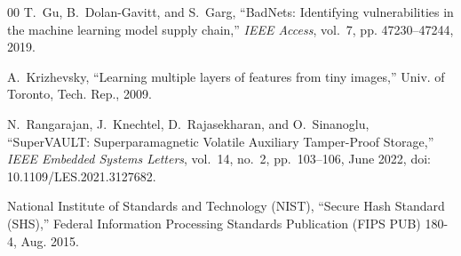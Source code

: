 \documentclass[conference,10pt]{IEEEtran}
\begin{document}
\begin{thebibliography}{00}
T.~Gu, B.~Dolan-Gavitt, and S.~Garg, ``BadNets: Identifying vulnerabilities in the machine learning model supply chain,'' \textit{IEEE Access}, vol.~7, pp. 47230--47244, 2019.

A.~Krizhevsky, ``Learning multiple layers of features from tiny images,'' Univ. of Toronto, Tech. Rep., 2009.

N.~Rangarajan, J.~Knechtel, D.~Rajasekharan, and O.~Sinanoglu,
``SuperVAULT: Superparamagnetic Volatile Auxiliary Tamper-Proof Storage,''
\textit{IEEE Embedded Systems Letters},
vol.~14, no.~2, pp.~103--106, June 2022,
doi: 10.1109/LES.2021.3127682.


National Institute of Standards and Technology (NIST), ``Secure Hash Standard (SHS),'' Federal Information Processing Standards Publication (FIPS PUB) 180-4, Aug. 2015.

\end{thebibliography}
\end{document}
